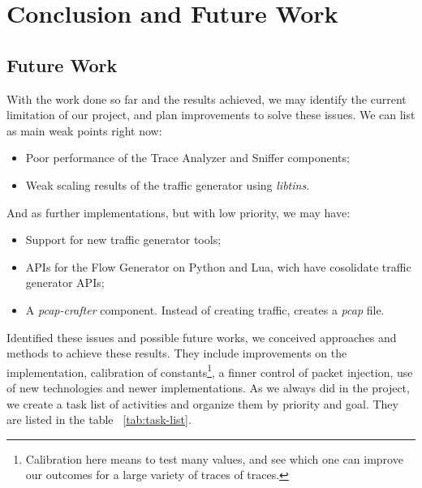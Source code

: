 \chapter{Conclusion and Future Work}\label{ch:conclusion}


\section{Future Work}

With the work done so far and the results achieved, we may identify the current limitation of our project, and plan improvements to solve these issues. 
We can list as  main weak points right now:

\begin{itemize}
	\item Poor performance of the Trace Analyzer and Sniffer components;
	\item Weak scaling results of the traffic generator using \textit{libtins}.
\end{itemize}

And as further implementations, but with low priority, we may have:

\begin{itemize}
	\item Support for new traffic generator tools;
	\item APIs for the Flow Generator on  Python and Lua, wich have cosolidate traffic generator APIs;
	\item A \textit{pcap-crafter} component. Instead of creating traffic, creates a \textit{pcap} file.
\end{itemize}

Identified these issues and possible future works, we conceived approaches and methods to achieve these results. They include improvements on the implementation,  calibration of constants\footnote{Calibration here means to test many values, and see which one can improve our outcomes for a large variety of traces of traces.}, a finner control of packet injection, use of new technologies and newer implementations. As we always did in the project, we create a task list of activities and organize them by priority and goal. They are listed in the table ~\ref{tab:task-list}.  


